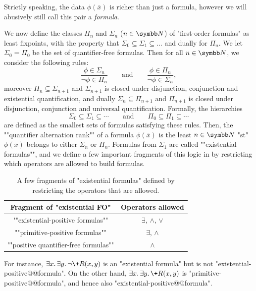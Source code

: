 \begin{remark}
	\label{rk:prelim-formula-tuple}
	Strictly speaking, the data $\phi(\bar x)$ is richer than just a
	formula, however we will abusively still call this pair a \emph{formula}.
\end{remark}

We now define the classes $\Pi_n$ and $\Sigma_n$ ($n\in\N$) of "first-order formulas"
as least fixpoints, with the property that $\Sigma_0 \subseteq \Sigma_1 \subseteq \dotsc$ and dually for $\Pi_n$.
We let $\Sigma_0 = \Pi_0$ be the set of quantifier-free formulas.
Then for all $n\in\N$, we consider the following rules:
\[
	\frac{
		\phi \in \Sigma_n
	}{
		\neg \phi \in \Pi_n
	} \qquad\text{and}\qquad
	\frac{
		\phi \in \Pi_n
	}{
		\neg \phi \in \Sigma_n
	},
\]
moreover $\Pi_n \subseteq \Sigma_{n+1}$ and $\Sigma_{n+1}$ is closed under
disjunction, conjunction and existential quantification,
and dually $\Sigma_n \subseteq \Pi_{n+1}$ and $\Pi_{n+1}$ is closed under
disjunction, conjunction and universal quantification.
Formally, the hierarchies
\[
	\Sigma_0 \subseteq \Sigma_1 \subseteq \cdots
	\qquad\text{and}\qquad
	\Pi_0 \subseteq \Pi_1 \subseteq \cdots
\]
are defined as the smallest sets of formulas satisfying these rules.
Then, the \AP""quantifier alternation rank"" of a formula $\phi(\bar x)$
is the least $n\in\N$ "st" $\phi(\bar x)$ belongs to either
$\Sigma_n$ or $\Pi_n$.
Formulas from $\Sigma_1$ are called ""existential formulas"",
and we define a few important fragments of this logic in 
by restricting which operators are allowed to build formulas.

\begin{table}
	\begin{tabular}{cc}
		\toprule
		Fragment of "existential FO" & Operators allowed \\ \midrule
		""existential-positive formulas"" & $\exists$, $\land$, $\lor$ \\
		""primitive-positive formulas"" & $\exists$, $\land$ \\
		""positive quantifier-free formulas"" & $\land$ \\ \bottomrule
	\end{tabular}
	\caption{\AP\label{tab:fragments-exist-FO}
	A few fragments of "existential formulas" defined by restricting the operators
	that are allowed.}
\end{table}
For instance, $\exists x.\, \exists y.\, \neg \+R(x,y)$ is an "existential formula"
but is not "existential-positive@@formula".
On the other hand, $\exists x.\, \exists y.\, \+R(x,y)$ is "primitive-positive@@formula",
and hence also "existential-positive@@formula".

